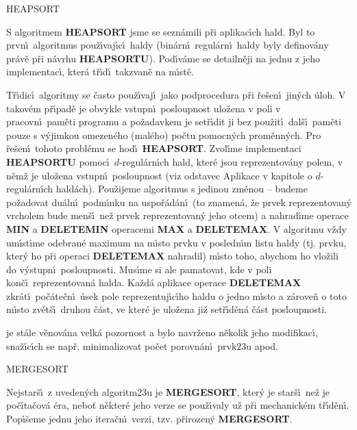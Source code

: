 \head
HEAPSORT
\endhead

\flushpar S algoritmem {\bf HEAPSORT} jsme se sezn\'amili p\v ri 
aplikac\'\i ch hald.  Byl to prvn\'\i\ algoritmus pou\v z\'\i vaj\'\i c\'\i\ haldy 
(bin\'arn\'\i\ regul\'ar\-n\'\i\ haldy byly definov\'any pr\'av\v e p\v ri n\'avrhu 
{\bf HEAP\-SORTU}).  Pod\'\i v\'ame se detailn\v eji na jednu z jeho 
implementac\'\i , kter\'a t\v r\'\i d\'\i\ takzvan\v e na m\'\i st\v e. 
\medskip

\flushpar T\v r\'\i dic\'\i\ algoritmy se \v casto pou\v z\'\i vaj\'\i\ jako 
podprocedura p\v ri \v re\v sen\'\i\ jin\'ych \'uloh. V takov\'em p\v r\'\i pad\v e je 
obvykle vstupn\'\i\ posloupnost ulo\v zena v poli v pracovn\'\i\ 
pam\v eti programu a po\v za\-dav\-kem  je set\v r\'\i dit ji 
bez pou\v zit\'\i\ dal\v s\'\i\ 
pam\v eti pouze s v\'yjimkou omezen\'eho (mal\'eho) po\v ctu pomocn\'ych 
prom\v enn\'ych. Pro \v re\v sen\'\i\ tohoto probl\'emu se hod\'\i\ 
{\bf HEAPSORT}. Zvol\'\i me implementaci {\bf HEAPSORTU} pomoc\'\i\ 
$d$-regul\'arn\'\i ch hald, kter\'e jsou reprezentov\'any  
polem, v n\v em\v z je ulo\v zena vstupn\'\i\ posloupnost (viz odstavec 
Aplikace v kapitole o $d$-regul\'arn\'\i ch hald\'ach). Pou\v zijeme 
algoritmus s jedinou zm\v enou -- budeme po\v zadovat du\'aln\'\i\ 
podm\'\i nku na uspo\v r\'ad\'an\'\i\ (to znamen\'a, \v ze prvek reprezentovan\'y 
vrcholem bude men\v s\'\i\ ne\v z prvek reprezentovan\'y jeho 
otcem) a nahrad\'\i me operace {\bf MIN} a {\bf DELETEMIN }
operacemi {\bf MAX} a {\bf DELETEMAX}. V algoritmu v\v zdy um\'\i st\'\i me 
odebran\'e maximum na m\'\i sto prvku v posled\-n\'\i m listu 
haldy (tj. prvku, kter\'y ho p\v ri operaci {\bf DELETEMAX }
nahradil) m\'\i sto toho, abychom ho vlo\v zili 
do v\'ystupn\'\i\ posloupnosti. Mus\'\i me si ale 
pamatovat, kde v poli kon\v c\'\i\ reprezentovan\'a halda. Ka\v zd\'a 
aplikace operace {\bf DELETEMAX} zkr\'at\'\i\ po\v c\'ate\v cn\'\i\ \'usek pole 
reprezentuj\'\i c\'\i ho haldu o jedno m\'\i sto 
a z\'arove\v n o toto m\'\i sto zv\v et\v s\'\i\ druhou \v c\'ast, ve kter\'e je ulo\v zena ji\v z 
set\v r\'\i d\v en\'a \v c\'ast posloupnosti. 
\medskip

\flushpar {\bf HEAPSORTU} je st\'ale v\v enov\'ana velk\'a pozornost a 
bylo navr\v ze\-no n\v ekolik jeho modifikac\'\i , sna\v z\'\i c\'\i ch se 
nap\v r. minimalizovat po\v cet porovn\'an\'\i\ prvk\accent23u apod.
\bigskip

\head
MERGESORT
\endhead

\flushpar Nejstar\v s\'\i\ z uveden\'ych algoritm\accent23u je 
{\bf MERGESORT}, kter\'y je star\v s\'\i\ ne\v z je po\v c\'\i ta\v cov\'a \'era, 
nebo\v t n\v ekter\'e jeho 
verze se pou\v z\'\i valy u\v z p\v ri mecha\-nick\'em t\v r\'\i d\v en\'\i . Pop\'\i\v seme 
jednu jeho itera\v cn\'\i\ verzi, tzv. p\v rirozen\'y {\bf MERGESORT}. 
\bigskip

